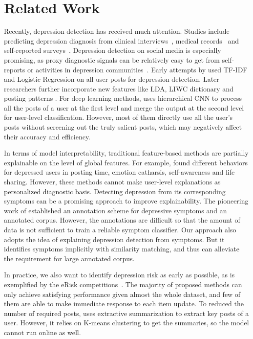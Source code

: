 \section{Related Work}
Recently, depression detection has received much attention. Studies include predicting depression diagnosis from clinical interviews~\cite{gratch2014distress}, medical records~\cite{eichstaedt2018facebook} and self-reported surveys~\cite{guntuku2019twitter}. Depression detection on social media is especially promising, as proxy diagnostic signals can be relatively easy to get from self-reports or activities in depression communities~\cite{ernala2019methodological}. Early attempts by \citeauthor{losada2016test} used TF-IDF and Logistic Regression on all user posts for depression detection. Later researchers further incorporate new features like LDA, LIWC dictionary and posting patterns \cite{trotzek2018utilizing}. For deep learning methods, \citeauthor{yates2017depression} 
uses hierarchical CNN to process all the posts of a user at the first level and merge the output at the second level for user-level classification. However, most of them directly use all the user's posts without screening out the truly salient posts, which may negatively affect their accuracy and efficiency.

In terms of model interpretability, traditional feature-based methods are partially explainable on the level of global features. For example, \citeauthor{shen2017depression} found different behaviors for depressed users in posting time, emotion catharsis, self-awareness and life sharing. However, these methods cannot make user-level explanations as personalized diagnostic basis. Detecting depression from its corresponding symptoms can be a promising approach to improve explainability. The pioneering work of \citeauthor{mowery2017understanding} established an annotation scheme for depressive symptoms and an annotated corpus. However, the annotations are difficult so that the amount of data is not sufficient to train a reliable symptom classifier. Our approach also adopts the idea of explaining depression detection from symptoms. But it identifies symptoms implicitly with similarity matching, and thus can alleviate the requirement for large annotated corpus.

In practice, we also want to identify depression risk as early as possible, as is exemplified by the eRisk competitions~\cite{losada2019overview}. The majority of proposed methods can only achieve satisfying performance given almost the whole dataset, and few of them are able to make immediate response to each item update. To reduced the number of required posts, \citeauthor{zogan2021depressionnet} uses extractive summarization to extract key posts of a user. However, it relies on K-means clustering to get the summaries, so the model cannot run online as well. 

